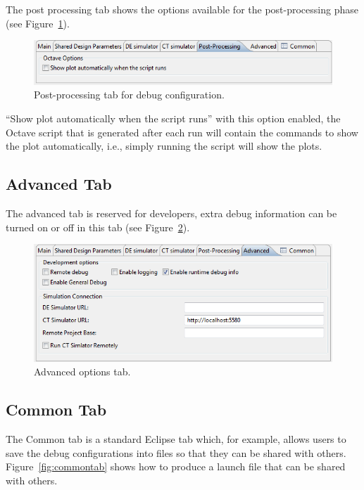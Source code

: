 \documentclass{crescendorepchap}
\begin{document}
The post processing tab shows the options available for the
post-processing phase (see Figure~\ref{fig:postproctab}).

\begin{figure}[htbp]
\centering
\includegraphics[width=.6\textwidth]{images/Postprocessingtab.png}
\caption{Post-processing tab for debug configuration.\label{fig:postproctab}}
\end{figure}

``Show plot automatically when the script runs'' with this option
enabled, the Octave script that is generated after each run will
contain the commands to show the plot automatically, i.e., simply
running the script will show the plots.

\subsection{Advanced Tab}

The advanced tab is reserved for developers, extra debug information can
be turned on or off in this tab (see Figure~\ref{fig:advancedtab}). 

\begin{figure}[htbp]
\centering
\includegraphics[width=.6\textwidth]{images/Advancedoptionstab.png}
\caption{Advanced options tab.\label{fig:advancedtab}}
\end{figure}

\subsection{Common Tab}

The Common tab is a standard Eclipse tab which, for example, allows
users to save the debug configurations into files so that they can be
shared with others. Figure~\ref{fig:commontab} shows how to produce a launch file that can be shared with others.
\end{document}
